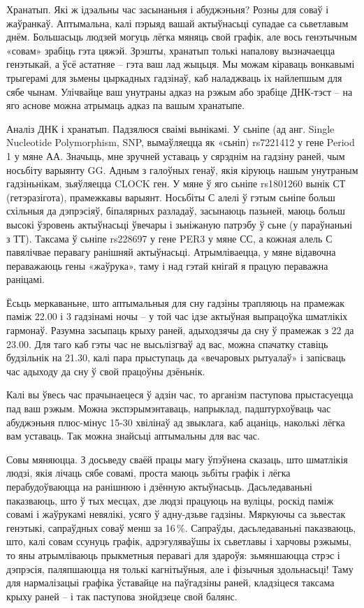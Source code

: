 Хранатып. Які ж ідэальны час засынаньня і абуджэньня? Розны для соваў і жаўранкаў. Аптымальна, калі пэрыяд вашай актыўнасьці супадае са сьветлавым днём. Большасьць людзей могуць лёгка мяняць свой графік, але вось генэтычным «совам» зрабіць гэта цяжэй. Зрэшты, хранатып толькі напалову вызначаецца генэтыкай, а ўсё астатняе – гэта ваш лад жыцьця. Мы можам кіраваць вонкавымі трыгерамі для зьмены цыркадных гадзінаў, каб наладжваць іх найлепшым для сябе чынам. Улічвайце ваш унутраны адказ на рэжым або зрабіце ДНК-тэст – на яго аснове можна атрымаць адказ па вашым хранатыпе.

Аналіз ДНК і хранатып. Падзялюся сваімі вынікамі. У сьніпе (ад анг. Single Nucleotide Polymorphism, SNP, вымаўляецца як «сьніп) rs7221412 у гене Period 1 у мяне АА. Значыць, мне зручней уставаць у сярэднім на гадзіну раней, чым носьбіту варыянту GG. Адным з галоўных генаў, якія кіруюць нашым унутраным гадзіньнікам, зьяўляецца CLOCK ген. У мяне ў яго сьніпе rs1801260 вынік СТ (гетэразігота), прамежкавы варыянт. Носьбіты С алелі ў гэтым сьніпе больш схільныя да дэпрэсіяў, біпалярных разладаў, засынаюць пазьней, маюць больш высокі ўзровень актыўнасьці ўвечары і зьніжаную патрэбу ў сьне (у параўнаньні з ТТ). Таксама ў сьніпе rs228697 у гене PER3 у мяне СС, а кожная алель С павялічвае перавагу ранішняй актыўнасьці. Атрымліваецца, у мяне відавочна пераважаюць гены «жаўрука», таму і над гэтай кнігай я працую пераважна раніцамі.

Ёсьць меркаваньне, што аптымальныя для сну гадзіны трапляюць на прамежак паміж 22.00 і 3 гадзінамі ночы – у той час ідзе актыўная выпрацоўка шматлікіх гармонаў. Разумна засыпаць крыху раней, адыходзячы да сну ў прамежак з 22 да 23.00. Для таго каб гэты час не высьлізгваў ад вас, можна спачатку ставіць будзільнік на 21.30, калі пара прыступаць да «вечаровых рытуалаў» і запісваць час адыходу да сну ў свой працоўны дзёньнік.

Калі вы ўвесь час прачынаецеся ў адзін час, то арганізм паступова прыстасуецца пад ваш рэжым. Можна экспэрымэнтаваць, напрыклад, падштурхоўваць час абуджэньня плюс-мінус 15-30 хвілінаў ад звыклага, каб ацаніць, наколькі лёгка вам уставаць. Так можна знайсьці аптымальны для вас час.

Совы мяняюцца. З досьведу сваёй працы магу ўпэўнена сказаць, што шматлікія людзі, якія лічаць сябе совамі, проста маюць зьбіты графік і лёгка перабудоўваюцца на ранішнюю і дзённую актыўнасьць. Дасьледаваньні паказваюць, што ў тых месцах, дзе людзі працуюць на вуліцы, роскід паміж совамі і жаўрукамі невялікі, усяго ў адну-дзьве гадзіны. Мяркуючы са зьвестак генэтыкі, сапраўдных соваў менш за 16\,\%. Сапраўды, дасьледаваньні паказваюць, што, калі совам ссунуць графік, адрэгуляваўшы іх сьветлавы і харчовы рэжымы, то яны атрымліваюць прыкметныя перавагі для здароўя: зьмяншаюцца стрэс і дэпрэсія, паляпшаюцца ня толькі кагнітыўныя, але і фізычныя здольнасьці! Таму для нармалізацыі графіка ўставайце на паўгадзіны раней, кладзіцеся таксама крыху раней – і так паступова знойдзеце свой балянс.

